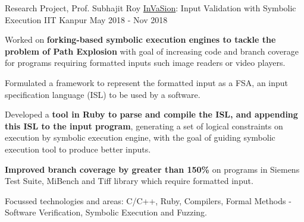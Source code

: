 \begin{cventries}







  \cventry
    {Research Project, Prof. Subhajit Roy} %
    {\href{https://arxiv.org/abs/2104.01438}{InVaSion}: Input Validation with Symbolic Execution} %
    {IIT Kanpur} %
    {May 2018 - Nov 2018} %
    {
      \begin{cvitems} %
      \item {Worked on \textbf{forking-based symbolic execution engines to tackle the problem of Path Explosion} with goal of increasing code and branch coverage for programs requiring formatted inputs such image readers or video players.}
      \item {Formulated a framework to represent the formatted input as a FSA, an input specification language (ISL) to be used by a software.}
        \item {Developed a \textbf{tool in Ruby to parse and compile the ISL, and appending this ISL to the input program}, generating a set of logical constraints on execution by symbolic execution engine, with the goal of guiding symbolic execution tool to produce better inputs.}
        \item {\textbf{Improved branch coverage by greater than 150\%} on programs in Siemens Test Suite, MiBench and Tiff library which require formatted input.}
        \item {Focussed technologies and areas: C/C++, Ruby, Compilers, Formal Methods - Software Verification, Symbolic Execution and Fuzzing.}
      \end{cvitems}
    }%


\end{cventries}
